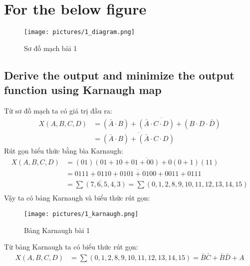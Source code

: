 \section{For the below figure}
    \begin{figure}[H]
        \centering
        \texttt{[image: pictures/1\_diagram.png]}
        \caption{Sơ đồ mạch bài 1}
    \end{figure}
    \subsection{Derive the output and minimize the output function using Karnaugh map}
        \hspace*{0.6cm}Từ sơ đồ mạch ta có giá trị đầu ra:
        \begin{align*}
            X(A, B, C, D) &= \overline{(\bar{A} \cdot B) + (\bar{A} \cdot C \cdot D) + (B \cdot D \cdot \bar{D})} \\
            &= \overline{(\bar{A} \cdot B) + (\bar{A} \cdot C \cdot D)}  
        \end{align*}
        \hspace*{0.6cm}Rút gọn biểu thức bằng bìa Karnaugh:
        \begin{align*}
            X(A, B, C, D) &= \overline{(01)(01 + 10 + 01 + 00) + 0(0 + 1) (11)} \\
            &= \overline{0111 + 0110 + 0101 + 0100 + 0011 + 0111} \\
            &= \overline{\sum{(7,6,5,4,3)}} = \sum{(0,1,2,8,9,10,11,12,13,14,15)} \\
        \end{align*}
        \hspace*{0.6cm}Vậy ta có bảng Karnaugh và biểu thức rút gọn:
        \begin{figure}[H]
            \centering
            \texttt{[image: pictures/1\_karnaugh.png]}
            \caption{Bảng Karnaugh bài 1}
        \end{figure}
        Từ bảng Karnaugh ta có biểu thức rút gọn:
        \begin{align*}
            X(A, B, C, D) &= \sum{(0,1,2,8,9,10,11,12,13,14,15)} = \bar{B}\bar{C} + \bar{B}\bar{D} + A\\
        \end{align*}
